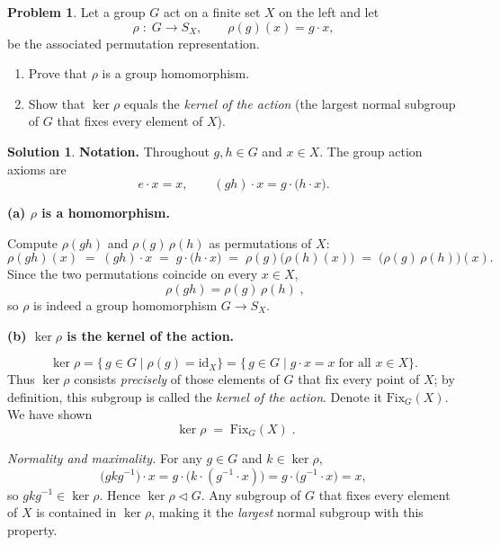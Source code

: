 \documentclass[12pt]{article}
\theoremstyle{definition} %
\newtheorem{solution}{Solution}
\newtheorem{problem}{Problem}
\theoremstyle{plain} %
\begin{document}
  \begin{problem}
    Let a group \(G\) act on a finite set \(X\) on the left and let  
    \[
       \rho \;:\; G \longrightarrow S_{X}, 
       \qquad 
       \rho(g)(x)=g\!\cdot\!x ,
    \]
    be the associated permutation representation.
    \begin{enumerate}[]
       \item Prove that \(\rho\) is a group homomorphism.
       \item Show that \(\ker\rho\) equals the \emph{kernel of the action}
             (the largest normal subgroup of \(G\) that fixes every element of \(X\)).
    \end{enumerate}
    \end{problem}
    
    \begin{solution}
    \textbf{Notation.}
    Throughout \(g,h\in G\) and \(x\in X\).
    The group action axioms are
    \[
       e\!\cdot\!x = x,
       \qquad
       (gh)\!\cdot\!x = g\!\cdot\!\bigl(h\!\cdot\!x\bigr).
    \]
    
    \bigskip
    \textbf{(a)  \(\rho\) is a homomorphism.}
    
    Compute \(\rho(gh)\) and \(\rho(g)\,\rho(h)\) as permutations of \(X\):
    \[
       \rho(gh)(x) \;=\; (gh)\!\cdot\!x
                     \;=\; g\!\cdot\!\bigl(h\!\cdot\!x\bigr)
                     \;=\; \rho(g)\!\bigl(\rho(h)(x)\bigr)
                     \;=\; \bigl(\rho(g)\,\rho(h)\bigr)(x).
    \]
    Since the two permutations coincide on every \(x\in X\),
    \[
       \boxed{\;\rho(gh)=\rho(g)\,\rho(h)\;} ,
    \]
    so \(\rho\) is indeed a group homomorphism \(G\to S_{X}\).
    
    \bigskip
    \textbf{(b)  \(\ker\rho\) is the kernel of the action.}
    
    \[
    \ker\rho
       =\{\,g\in G \mid \rho(g)=\mathrm{id}_{X}\}
       =\{\,g\in G \mid g\!\cdot\!x = x\;\text{for all }x\in X\}.
    \]
    Thus \(\ker\rho\) consists \emph{precisely} of those elements of \(G\)
    that fix every point of \(X\); by definition, this subgroup is called
    the \emph{kernel of the action}.  Denote it
    \(\mathrm{Fix}_{G}(X)\).  We have shown
    \[
       \boxed{\;\ker\rho \;=\; \mathrm{Fix}_{G}(X)\;} .
    \]
    
    \smallskip
    \emph{Normality and maximality.}
    For any \(g\in G\) and \(k\in\ker\rho\),
    \[
       \bigl(gkg^{-1}\bigr)\!\cdot\!x
          = g\!\cdot\!\bigl(k\!\cdot\!(g^{-1}\!\cdot\!x)\bigr)
          = g\!\cdot\!\bigl(g^{-1}\!\cdot\!x\bigr)
          = x,
    \]
    so \(gkg^{-1}\in\ker\rho\).  Hence \(\ker\rho\lhd G\).  
    Any subgroup of \(G\) that fixes every element of \(X\) is contained in
    \(\ker\rho\), making it the \emph{largest} normal subgroup with this
    property.
    
    \end{solution}
\end{document}
